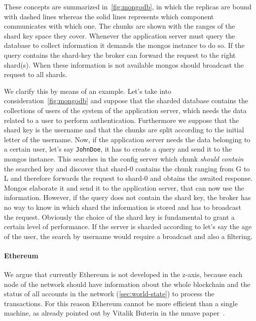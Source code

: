 These concepts are summarized in~\autoref{fig:mongodb}, in which the replicas
are bound with dashed lines whereas the solid lines represents which
component communicates with which one. The chunks are shown with the
ranges of the shard key space they cover.
Whenever the application server must query the database to collect information
it demands the mongos instance to do so. If the query contains the shard-key
the broker can forward the request to the right shard(s). When these information
is not available mongos should broadcast the request to all shards.

We clarify this by means of an example. Let's take into 
consideration~\autoref{fig:mongodb} and suppose that the sharded database
contains the collections of users of the system of the application server,
which needs the data related to a user to perform authentication.
Furthermore we suppose that the shard key is the username and that the chunks
are split according to the initial letter of the username. Now, if the 
application server needs the data belonging to a certain user, let's say 
\texttt{JohnDoe}, it has to create a query and send it to the mongos instance. 
This searches in the config server which chunk \emph{should contain} the
searched key and discover that shard-0 contains the chunk ranging from G to L 
and therefore forwards the request to shard-0 and obtains the awaited response.
Mongos elaborate it and send it to the application server, that can now use
the information. However, if the query does not contain the shard key, the 
broker has no way to know in which shard the information is stored and has to
broadcast the request.
Obviously the choice of the shard key is fundamental to grant a certain
level of performance. If the server is sharded according to let's say the age
of the user, the search by username would require a broadcast and also a 
filtering.

  









\paragraph{Ethereum} We argue that currently Ethereum is not developed in the
z-axis, because each node of the network should have information about the whole
blockchain and the status of all accounts in the network 
(\autoref{sec:world-state}) to process the transactions. For this reason 
Ethereum cannot be more efficient than a single machine, as already pointed out 
by Vitalik Buterin in the muave paper~\cite{bib:mauve}.

